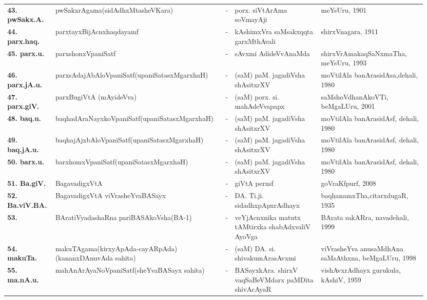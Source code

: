 {\begin{longtable}{@{}lp{5cm}cp{5cm}<{\raggedright}p{3cm}<{\raggedright}@{}}
{\bf 43. pwSakx.A.} & pwSakxrAgama\newline (sidAdhxMtasheVKara) &-& porx. siVtArAma soVmayAji & meYsUru, 1901\\
{\bf 44. parx.haq.} & parxtayxBijAcnxhaqdayamf &-& kAshimxVra saMsakxqqta garxMthAvali & shirxVnagara, 1911\\
{\bf 45. parx.u.} & parxshonxVpaniSatf &-& sAvxmi AdideVvAnaMda & shirxVrAmakaqSaNxmaTha, meYsUru, 1993\\
{\bf 46. parx.jA.u.} & parxsAdajAbAloVpaniSatf\newline (upaniSatasxMgarxhaH) &-& (saM) paM. jagadiVsha shAsitxrXV & moVtilAla banArasidAsa,\newline dehali, 1980\\
{\bf 47. parx.giV.} & parxBugiVtA (mAyideVva) &-& (saM) porx. si. mahAdeVvapapx & saMshoVdhanAkoVTi, beMgaLUru, 2001\\
{\bf 48. baq.u.} & baqhadAraNayxkoVpaniSatf\newline (upaniSatasxMgarxhaH) &-& (saM) paM. jagadiVsha shAsitxrXV & moVtilAla banArasidAsf, dehali, 1980\\
{\bf 49. baq.jA.u.} & baqhajAjxbAloVpaniSatf\newline (upaniSatasxMgarxhaH) &-& (saM) paM. jagadiVsha shAsitxrXV & moVtilAla banArasidAsf, dehali, 1980\\
{\bf 50. barx.u.} & barxhomxVpaniSatf\newline (upaniSatasxMgarxhaH) &-& (saM) paM. jagadiVsha shAsitxrXV & moVtilAla banArasidAsf, dehali, 1980\\
{\bf 51. Ba.giV.} & BagavadigxVtA &-& giVtA perxsf & goVraKfpurf, 2008\\
{\bf 52. Ba.viV.BA.} & BagavadigxVtA viVrasheYvaBASayx &-& DA. Ti.ji. sidadhxpApxrAdhayx & baqhanamxTha,\newline citarxdugaR, 1935\\
{\bf 53. } & BAratiVyadashaRna pariBASAkoVsha\newline (BA-1) &-& veYjAcnxnika matutx tAMtirxka shabAdxvaliV AyoVga & BArata sakARra, navadehali, 1999\\
{\bf 54. makuTa.} & makuTAgama\newline (kirxyApAda-cayAR\-pAda)\newline (kananxDAnuvAda sahita) &-& (saM) DA. si. shivakumArasAvxmi & viVrasheYva anusaMdhAna saMsAthxna, beMgaLUru, 1998\\
{\bf 55. ma.nA.u.} & mahAnArAyaNoVpaniSatf\newline (sheYvaBASayx sahita) &-& BASayxkAra. shirxV vaqSaBeVMdarx paMDita shivAcAyaR & vishAvxrAdhayx gurukula, kAshiV, 1959\\

\end{longtable}}
